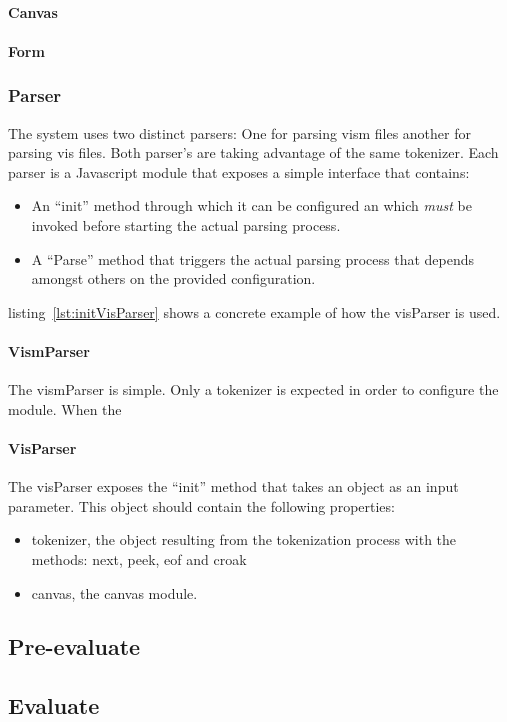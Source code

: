 \paragraph{Canvas}
\label{sec:Canvas}

\paragraph{Form}
\label{sec:Form}

\subsubsection{Parser}
\label{sec:Parser}

The system uses two distinct parsers: One for parsing vism files another for parsing vis files. Both parser's are taking advantage of the same tokenizer. Each parser is a Javascript module that exposes a simple interface that contains:
\begin{itemize}
    \item An ``init'' method through which it can be configured an which \emph{must} be invoked before starting the actual parsing process.
    \item A ``Parse'' method that triggers the actual parsing process that depends amongst others on the provided configuration.
\end{itemize}



listing~\ref{lst:initVisParser} shows a concrete example of how the visParser is used.

\paragraph{VismParser}
\label{sec:VismParser}
The vismParser is simple. Only a tokenizer is expected in order to configure the module. When the  

\paragraph{VisParser}
\label{sec:VisParser}

The visParser exposes the ``init'' method that takes an object as an input parameter. This object should contain the following properties:
\begin{itemize}
    \item tokenizer, the object resulting from the tokenization process with the methods: next, peek, eof and croak
    \item canvas, the canvas module. 
\end{itemize}


\subsection{Pre-evaluate}
\label{sec:PreEvaluate}

\subsection{Evaluate}
\label{sec:Eval}

